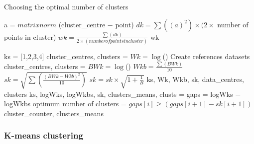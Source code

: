 \begin{algorithm}
\label{alg:GapStatistic}
\caption{Choosing the optimal number of clusters}
 \begin{algorithmic}[1]
    \Statex
    			\State a = $matrix norm$ (cluster\_centre $-$ point)
    		\EndFor
    		\State $dk = \sum((a)^2 )\times (2 \times $ number of points in cluster)
    	\EndFor
    	\State $wk = \frac{ \sum(dk)}{2 \times (number of points in cluster)}$
    	\State \Return wk
    \EndFunction
    
    \Statex
    	 	\State ks = [1,2,3,4]
   			\State cluster\_centres, clusters = 
   			\State $Wk = \log$()   			
   			\State Create references datasets
			\State cluster\_centres, clusters =  
  			\State $BWk = \log$()
   			\EndFor   
   			\State $Wkb = \frac{\sum(BWk)}{10} $	
   			\State $sk = \sqrt{\sum(\frac{(BWk - Wkb)^2}{10})}$	
    	\EndFor
    \State $sk = sk \times \sqrt{1+\frac{1}{B}}$
    \State \Return ks, Wk, Wkb, sk, data\_centres, clusters
    \EndFunction
    \Statex
		    \State ks, logWks, logWkbs, sk, clusters\_means, clusts = 
		    \State gaps = logWks $-$ logWkbs
		    \State optimum number of clusters = $gaps[i] \geq (gaps[i+1]-sk[i+1])$
	\State \Return cluster\_counter, clusters\_means
	\EndFunction
  \end{algorithmic}
\end{algorithm}

\newpage
\subsubsection{K-means clustering}

